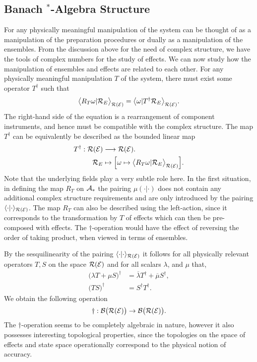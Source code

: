\documentclass[11pt]{article}
\begin{document}
\subsection*{Banach $^*$-Algebra Structure}
For any physically meaningful manipulation of the system can be thought of as a manipulation of the preparation procedures or dually as a manipulation of the ensembles. From the discussion above for the need of complex structure, we have the tools of complex numbers for the study of effects. We can now study how the manipulation of ensembles and effects are related to each other. For any physically meaningful manipulation $T$ of the system, there must exist some operator $T^\dagger$ such that
$$\big\langle R_T\omega|\mathcal{R}_E\big\rangle_{\mathcal{R}(\mathcal{E})}=\big\langle \omega|T^\dagger \mathcal{R}_E\big\rangle_{\mathcal{R}(\mathcal{E})}.$$
The right-hand side of the equation is a rearrangement of component instruments, and hence must be compatible with the complex structure. The map $T^\dagger$ can be equivalently be described as the bounded linear map
\begin{align*}
	T^\dagger:\mathcal{R}(\mathcal{E})&\longrightarrow \mathcal{R}(\mathcal{E}).\\
				\mathcal{R}_E&\mapsto \Big[\omega\mapsto \big\langle R_T\omega|\mathcal{R}_E\big\rangle_{\mathcal{R}(\mathcal{E})}\Big].
\end{align*}
Note that the underlying fields play a very subtle role here. In the first situation, in defining the map $R_T$ on $\mathcal{A}_*$ the pairing $\mu(\cdot|\cdot)$ does not contain any additional complex structure requirements and are only introduced by the pairing $\langle \cdot|\cdot\rangle_{\mathcal{R}(\mathcal{E})}$. The map $R_T$ can also be described using the left-action, since it corresponds to the transformation by $T$ of effects which can then be pre-composed with effects. The $\dagger$-operation would have the effect of reversing the order of taking product, when viewed in terms of ensembles.

By the sesquilinearity of the pairing $\langle \cdot|\cdot\rangle_{\mathcal{R}(\mathcal{E})}$ it follows for all physically relevant operators $T,S$ on the space $\mathcal{R}(\mathcal{E})$ and for all scalars $\lambda$, and $\mu$ that,
\begin{align*}
	\big({\lambda T+\mu S}\big)^\dagger &=\overline{\lambda} T^\dagger +\overline{\mu} S^\dagger , \\
	\big(TS\big)^\dagger&=S^\dagger T^\dagger.
\end{align*}
We obtain the following operation
\[\dagger:\mathcal{B}\big(\mathcal{R}(\mathcal{E})\big)\to \mathcal{B}\big(\mathcal{R}(\mathcal{E})\big).\]
The $\dagger$-operation seems to be completely algebraic in nature, however it also  possesses interesting topological properties, since the topologies on the space of effects and state space operationally correspond to the physical notion of accuracy.
\end{document}
